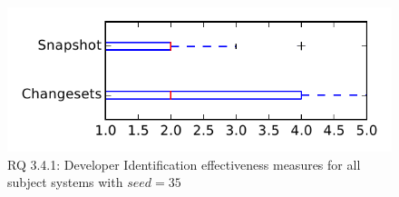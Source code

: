 
\begin{figure}
\centering
\includegraphics[height=0.4\textheight]{figures/dit_seed/rq1_tiny_35}
\caption{RQ 3.4.1: Developer Identification effectiveness measures for all subject systems with $seed=35$}
\label{fig:dit_seed:rq1:tiny}
\end{figure}
